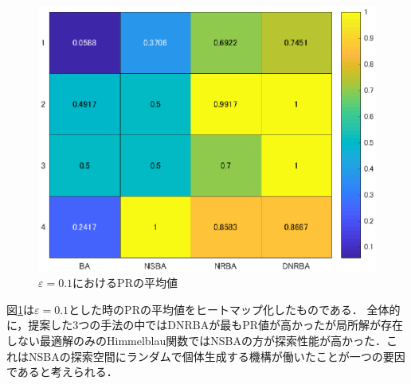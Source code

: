 \documentclass[twocolumn, a4paper]{UECIEresume}
\begin{document}
\begin{figure}[h]
\centering
\includegraphics[width=1.0\linewidth]{eps/results_comp.eps}
\caption{$\varepsilon=0.1$におけるPRの平均値}
\label{fig:resutls_comp_E1}
\end{figure}




図\ref{fig:resutls_comp_E1}は$\varepsilon=0.1$とした時のPRの平均値をヒートマップ化したものである．
全体的に，提案した3つの手法の中ではDNRBAが最もPR値が高かったが局所解が存在しない最適解のみのHimmelblau関数ではNSBAの方が探索性能が高かった．これはNSBAの探索空間にランダムで個体生成する機構が働いたことが一つの要因であると考えられる．
\end{document}
